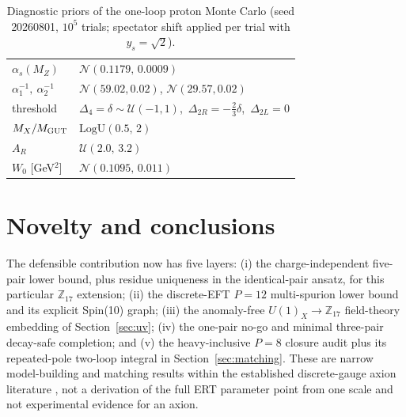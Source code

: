 \documentclass[11pt,a4paper]{article}
\newcommand{\Zs}{\mathbb{Z}_{17}}
\begin{document}
\FloatBarrier

\begin{table}[ht]
\centering
\caption{Diagnostic priors of the one-loop proton Monte Carlo (seed 20260801,
$10^5$ trials; spectator shift applied per trial with $y_s=\sqrt2$).}
\label{tab:priors}
\begin{tabular}{ll}
\toprule
$\alpha_s(M_Z)$ & $\mathcal{N}(0.1179,\,0.0009)$ \\
$\alpha_1^{-1},\ \alpha_2^{-1}$ & $\mathcal{N}(59.02,0.02)$,
  $\mathcal{N}(29.57,0.02)$ \\
threshold & $\Delta_4=\delta\sim\mathcal{U}(-1,1)$,\
  $\Delta_{2R}=-\tfrac23\delta$,\ $\Delta_{2L}=0$ \\
$M_X/M_{\rm GUT}$ & $\mathrm{LogU}(0.5,\,2)$ \\
$A_R$ & $\mathcal{U}(2.0,\,3.2)$ \\
$W_0$ [GeV$^2$] & $\mathcal{N}(0.1095,\,0.011)$ \\
\bottomrule
\end{tabular}
\end{table}

\section{Novelty and conclusions}
The defensible contribution now has five layers: (i) the charge-independent
five-pair lower bound, plus residue uniqueness in the identical-pair ansatz,
for this particular $\Zs$ extension; (ii) the discrete-EFT $P=12$
multi-spurion lower bound and its
explicit Spin(10) graph; (iii) the anomaly-free $U(1)_X\to\Zs$ field-theory
embedding of Section~\ref{sec:uv}; (iv) the one-pair no-go and minimal
three-pair decay-safe completion; and (v) the heavy-inclusive $P=8$
closure audit plus its repeated-pole two-loop integral in
Section~\ref{sec:matching}. These are narrow model-building and matching
results within the established discrete-gauge axion literature
\cite{BGW,DPT,DiLuzio,BDM}, not a derivation of the full ERT parameter
point from one scale and not experimental evidence for an axion.
\end{document}
